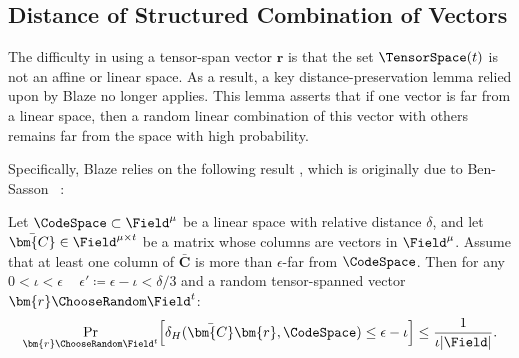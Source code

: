 \subsection{Distance of Structured Combination of Vectors}
\label{sec:distance}
The difficulty in using a tensor-span vector $\bm{r}$ is that the set
$\TensorSpace(t)$ is not an affine or linear space.
As a result, a key distance-preservation lemma relied upon by Blaze
no longer applies.
This lemma asserts that if one vector is far from a linear space, then a
random linear combination of this vector with others remains far from the
space with high probability.

Specifically, Blaze relies on the following result
\cite[Lemma~6.1]{eurocrypt/BrehmCFRRZ25}, which is originally due to 
Ben-Sasson \etal~\cite[Theorem~4.1]{ccc/Ben-SassonKS18}:

\begin{lemma}
\label{lemma:distanceBlaze}
{\normalfont \cite[Theorem~4.1]{ccc/Ben-SassonKS18}}
Let $\CodeSpace \subset \Field^\mu$ be a linear space with relative distance $\delta$,
and let $\bar{\bm{C}} \in \Field^{\mu\times t}$ be a matrix whose columns are vectors in $\Field^\mu$.
Assume that at least one column of $\bar{\bm{C}}$ is more than $\epsilon$-far from $\CodeSpace$.
Then for any $0<\iota<\epsilon$ \suchthat~ $\epsilon' \coloneqq \epsilon-\iota < \delta/3$ and a random tensor-spanned vector $\bm{r} \ChooseRandom \Field^t$:
\[
    \Pr_{\bm{r} \ChooseRandom \Field^t}\!\left[
        \delta_H(\bar{\bm{C}}\bm{r}, \CodeSpace) \le \epsilon-\iota
    \right]
    \le
    \frac{1}{\iota|\Field|}.
\]
\end{lemma}

